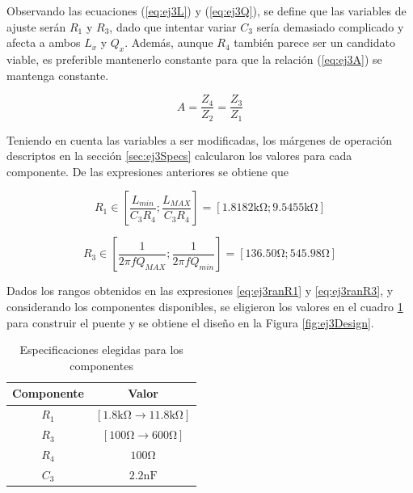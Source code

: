     Observando las ecuaciones (\ref{eq:ej3L}) y (\ref{eq:ej3Q}), se define que las variables
    de ajuste serán $R_1$ y $R_3$, dado que intentar variar $C_3$ sería demasiado 
    complicado y afecta a ambos $L_x$ y $Q_x$. Además, aunque $R_4$ también parece
    ser un candidato viable, es preferible mantenerlo constante para que la relación
    (\ref{eq:ej3A}) se mantenga constante.
    
    \begin{equation}
        A=\frac{Z_4}{Z_2}=\frac{Z_3}{Z_1}
        \label{eq:ej3A}
    \end{equation}
    
    Teniendo en cuenta las variables a ser modificadas, los márgenes de operación
    descriptos en la sección \ref{sec:ej3Specs} calcularon los valores para cada componente.
    De las expresiones anteriores se obtiene que

    \begin{equation}
        R_1 \in [\frac{L_{min}}{C_3 R_4};\frac{L_{MAX}}{C_3 R_4}] = [1.8182\si{\kilo\ohm}; 9.5455\si{\kilo\ohm}]
        \label{eq:ej3ranR1}
    \end{equation}

    \begin{equation}
        R_3 \in [\frac{1}{2 \pi f Q_{MAX}}; \frac{1}{2 \pi f Q_{min}}] = [136.50\si{\ohm}; 545.98\si{\ohm}]
        \label{eq:ej3ranR3}
    \end{equation}

    Dados los rangos obtenidos en las expresiones \ref{eq:ej3ranR1} y \ref{eq:ej3ranR3}, y considerando
    los componentes disponibles, se eligieron los valores en el cuadro \ref{tab:ej3Specs} para construir
    el puente y se obtiene el diseño en la Figura \ref{fig:ej3Design}.

    \begin{table}[h]
        \begin{center}
            \begin{tabular}{|c|c|}
                \hline
                Componente & Valor \\
                \hline
                $R_1$ & $[1.8\si{\kilo\ohm} \rightarrow 11.8\si{\kilo\ohm}]$\\
                $R_3$ & $[100\si{\ohm} \rightarrow 600\si{\ohm}]$\\
                $R_4$ & $100\si{\ohm}$\\
                $C_3$ & $2.2\si{\nano\farad}$\\
                \hline
            \end{tabular}
            \caption{Especificaciones elegidas para los componentes}
            \label{tab:ej3Specs}
        \end{center}
    \end{table}

